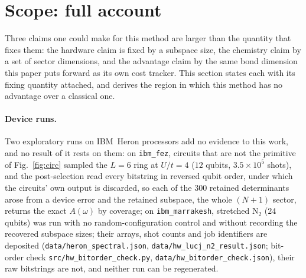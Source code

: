 \section{Scope: full account}
\label{sm:scope}

Three claims one could make for this method are larger than the quantity that fixes them: the hardware claim
is fixed by a subspace size, the chemistry claim by a set of sector dimensions, and the advantage claim
by the same bond dimension this paper puts forward as its own cost tracker. This section states each
with its fixing quantity attached, and derives the region in which this method
has no advantage over a classical one.

\paragraph{Device runs.} Two exploratory runs on IBM~Heron processors add no evidence to this work,
and no result of it rests on them: on \texttt{ibm\_fez}, circuits that are not the primitive of
Fig.~\ref{fig:circ} sampled the $L=6$ ring at $U/t=4$ ($12$ qubits, $3.5\times10^{5}$ shots), and the
post-selection read every bitstring in reversed qubit order, under which the circuits' own output is
discarded, so each of the $300$ retained determinants arose from a device error and the retained
subspace, the whole $(N{+}1)$ sector, returns the exact $A(\omega)$ by coverage; on
\texttt{ibm\_marrakesh}, stretched $\mathrm{N_2}$ ($24$ qubits) was run with no random-configuration
control and without recording the recovered subspace sizes; their arrays, shot counts and job
identifiers are deposited (\texttt{data/heron\_spectral.json}, \texttt{data/hw\_lucj\_n2\_result.json};
bit-order check \texttt{src/hw\_bitorder\_check.py}, \texttt{data/hw\_bitorder\_check.json}), their raw
bitstrings are not, and neither run can be regenerated.

